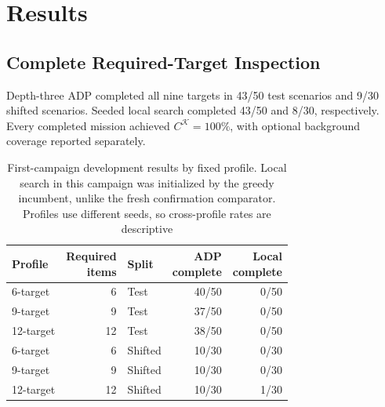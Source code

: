 \documentclass{IEEEtaes}
\newcommand{\RTTestN}{50}
\newcommand{\RTTestSuccess}{43}
\newcommand{\RTLocalTestSuccess}{43}
\newcommand{\RTOodN}{30}
\newcommand{\RTOodSuccess}{9}
\newcommand{\RTLocalOodSuccess}{8}
\theoremstyle{remark}
\theoremstyle{plain}
\begin{document}
\section{Results}
\label{sec:results}

\subsection{Complete Required-Target Inspection}

Depth-three ADP completed all nine targets in \RTTestSuccess/\RTTestN{} test scenarios and \RTOodSuccess/\RTOodN{} shifted scenarios. Seeded local search completed \RTLocalTestSuccess/\RTTestN{} and \RTLocalOodSuccess/\RTOodN{}, respectively. Every completed mission achieved $C^{\mathcal K}=100\%$, with optional background coverage reported separately.

\begin{table}[t]
  \centering
  \caption{First-campaign development results by fixed profile. Local search in this campaign was initialized by the greedy incumbent, unlike the fresh confirmation comparator. Profiles use different seeds, so cross-profile rates are descriptive}
  \label{tab:required-profile-results}
  \renewcommand{\arraystretch}{1.08}
  \setlength{\tabcolsep}{5pt}
  \footnotesize
  \begin{tabular*}{\linewidth}{@{\extracolsep{\fill}}lrlrr@{}}
    \toprule
    Profile & \shortstack[r]{Required\\items} & Split & \shortstack[r]{ADP\\complete} & \shortstack[r]{Local\\complete} \\
    \midrule
    6-target & 6 & Test & 40/50 & 0/50 \\
    9-target & 9 & Test & 37/50 & 0/50 \\
    12-target & 12 & Test & 38/50 & 0/50 \\
    6-target & 6 & Shifted & 10/30 & 0/30 \\
    9-target & 9 & Shifted & 10/30 & 0/30 \\
    12-target & 12 & Shifted & 10/30 & 1/30 \\
    \bottomrule
  \end{tabular*}
\end{table}
\end{document}
